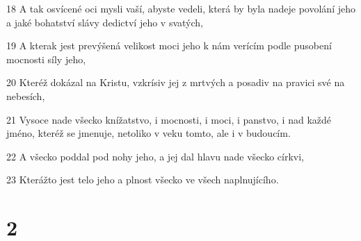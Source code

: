 \par 18 A tak osvícené oci mysli vaší, abyste vedeli, která by byla nadeje povolání jeho a jaké bohatství slávy dedictví jeho v svatých,
\par 19 A kterak jest prevýšená velikost moci jeho k nám verícím podle pusobení mocnosti síly jeho,
\par 20 Kteréž dokázal na Kristu, vzkrísiv jej z mrtvých a posadiv na pravici své na nebesích,
\par 21 Vysoce nade všecko knížatstvo, i mocnosti, i moci, i panstvo, i nad každé jméno, kteréž se jmenuje, netoliko v veku tomto, ale i v budoucím.
\par 22 A všecko poddal pod nohy jeho, a jej dal hlavu nade všecko církvi,
\par 23 Kterážto jest telo jeho a plnost všecko ve všech naplnujícího.

\chapter{2}


